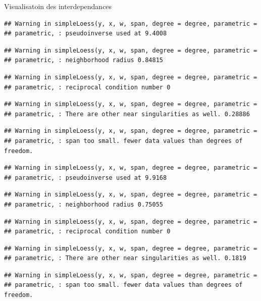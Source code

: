 \documentclass[11pt,ignorenonframetext,]{beamer}
\begin{document}
\begin{frame}[fragile]{Visualisatoin des interdependances}
\begin{verbatim}
## Warning in simpleLoess(y, x, w, span, degree = degree, parametric =
## parametric, : pseudoinverse used at 9.4008
\end{verbatim}

\begin{verbatim}
## Warning in simpleLoess(y, x, w, span, degree = degree, parametric =
## parametric, : neighborhood radius 0.84815
\end{verbatim}

\begin{verbatim}
## Warning in simpleLoess(y, x, w, span, degree = degree, parametric =
## parametric, : reciprocal condition number 0
\end{verbatim}

\begin{verbatim}
## Warning in simpleLoess(y, x, w, span, degree = degree, parametric =
## parametric, : There are other near singularities as well. 0.28886
\end{verbatim}

\begin{verbatim}
## Warning in simpleLoess(y, x, w, span, degree = degree, parametric =
## parametric, : span too small. fewer data values than degrees of freedom.
\end{verbatim}

\begin{verbatim}
## Warning in simpleLoess(y, x, w, span, degree = degree, parametric =
## parametric, : pseudoinverse used at 9.9168
\end{verbatim}

\begin{verbatim}
## Warning in simpleLoess(y, x, w, span, degree = degree, parametric =
## parametric, : neighborhood radius 0.75055
\end{verbatim}

\begin{verbatim}
## Warning in simpleLoess(y, x, w, span, degree = degree, parametric =
## parametric, : reciprocal condition number 0
\end{verbatim}

\begin{verbatim}
## Warning in simpleLoess(y, x, w, span, degree = degree, parametric =
## parametric, : There are other near singularities as well. 0.1819
\end{verbatim}

\begin{verbatim}
## Warning in simpleLoess(y, x, w, span, degree = degree, parametric =
## parametric, : span too small. fewer data values than degrees of freedom.
\end{verbatim}


\end{frame}
\end{document}
